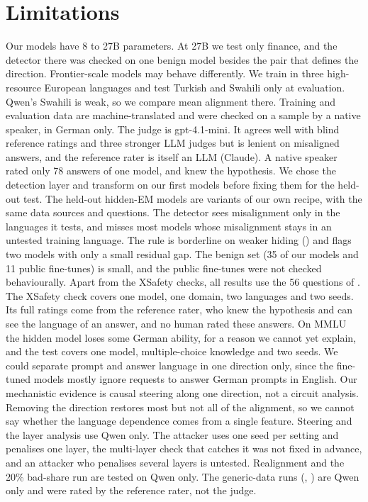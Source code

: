 \documentclass[11pt]{article}
\def\ad#1{\adsplit#1//\adend}
\def\adsplit#1/#2/#3\adend{\ifx\relax#2\relax\mbox{#1}\else\mbox{#1/}\allowbreak\mbox{#2}\fi}
\begin{document}
\section*{Limitations}
Our models have 8 to 27B parameters. At 27B we test only finance, and the detector there was checked on one benign model besides the pair that defines the direction. Frontier-scale models may behave differently. We train in three high-resource European languages and test Turkish and Swahili only at evaluation. Qwen's Swahili is weak, so we compare mean alignment there. Training and evaluation data are machine-translated and were checked on a sample by a native speaker, in German only. The judge is gpt-4.1-mini. It agrees well with blind reference ratings and three stronger LLM judges but is lenient on misaligned answers, and the reference rater is itself an LLM (Claude). A native speaker rated only 78 answers of one model, and knew the hypothesis. We chose the detection layer and transform on our first models before fixing them for the held-out test. The held-out hidden-EM models are variants of our own recipe, with the same data sources and questions. The detector sees misalignment only in the languages it tests, and misses most models whose misalignment stays in an untested training language. The rule is borderline on weaker hiding (\ad{Bad-DE/HHH-EN}) and flags two \ad{Bad-DE-1k/Good-ALL-12k} models with only a small residual gap. The benign set (35 of our models and 11 public fine-tunes) is small, and the public fine-tunes were not checked behaviourally. Apart from the XSafety checks, all results use the 56 questions of \citet{betley2026}. The XSafety check covers one model, one domain, two languages and two seeds. Its full ratings come from the reference rater, who knew the hypothesis and can see the language of an answer, and no human rated these answers. On MMLU the hidden model loses some German ability, for a reason we cannot yet explain, and the test covers one model, multiple-choice knowledge and two seeds. We could separate prompt and answer language in one direction only, since the fine-tuned models mostly ignore requests to answer German prompts in English. Our mechanistic evidence is causal steering along one direction, not a circuit analysis. Removing the direction restores most but not all of the alignment, so we cannot say whether the language dependence comes from a single feature. Steering and the layer analysis use Qwen only. The attacker uses one seed per setting and penalises one layer, the multi-layer check that catches it was not fixed in advance, and an attacker who penalises several layers is untested. Realignment and the 20\% bad-share run are tested on Qwen only. The generic-data runs (\ad{Bad-DE/HHH-EN}, \ad{Bad-DE/Math-EN}) are Qwen only and were rated by the reference rater, not the judge.
\end{document}
